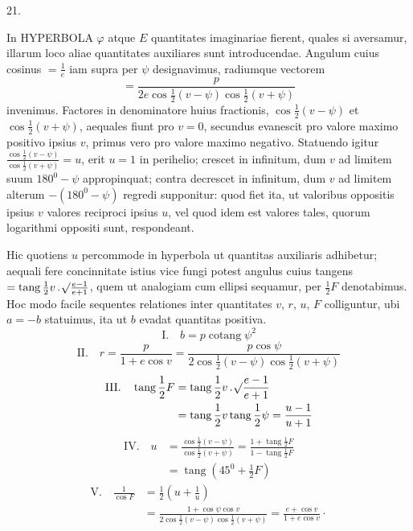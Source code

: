 \begin{center}
\hypertarget{native-038-article021}{}21.
\end{center}
In HYPERBOLA $\varphi$ atque $E$ quantitates imaginariae fierent, quales si aversamur, illarum loco aliae quantitates auxiliares sunt introducendae. Angulum cuius cosinus $=\frac{1}{e}$ iam supra per $\psi$ designavimus, radiumque vectorem
\[
=\frac{p}{2e\cos\frac{1}{2}(v-\psi)\cos\frac{1}{2}(v+\psi)}
\]
invenimus. Factores in denominatore huius fractionis, $\cos\frac{1}{2}(v-\psi)$ et $\cos\frac{1}{2}(v+\psi)$, aequales fiunt pro $v=0$, secundus evanescit pro valore maximo positivo ipsius $v$, primus vero pro valore maximo negativo. Statuendo igitur $\frac{\cos\frac{1}{2}(v-\psi)}{\cos\frac{1}{2}(v+\psi)}=u$, erit $u=1$ in perihelio; crescet in infinitum, dum $v$ ad limitem suum $180^0-\psi$ appropinquat; contra decrescet in infinitum, dum $v$ ad limitem alterum $-(180^0-\psi)$ regredi supponitur: quod fiet ita, ut valoribus oppositis ipsius $v$ valores reciproci ipsius $u$, vel quod idem est valores tales, quorum logarithmi oppositi sunt, respondeant.

Hic quotiens $u$ percommode in hyperbola ut quantitas auxiliaris adhibetur; aequali fere concinnitate istius vice fungi potest angulus cuius tangens $=\operatorname{tang}\frac{1}{2}v\, .\,\mathord{{}^{}\!\surd}\frac{e-1}{e+1}$, quem ut analogiam cum ellipsi sequamur, per $\frac{1}{2}F$ denotabimus. Hoc modo facile sequentes relationes inter quantitates $v$, $r$, $u$, $F$ colliguntur, ubi $a=-b$ statuimus, ita ut $b$ evadat quantitas positiva.
\[
\mathrm{I.}\quad b=p\operatorname{cotang}\psi^2
\]
\[
\mathrm{II.}\quad r=\frac{p}{1+e\cos v}=\frac{p\cos\psi}{2\cos\frac{1}{2}(v-\psi)\cos\frac{1}{2}(v+\psi)}
\]
\[
\begin{aligned}
\mathrm{III.}\quad\operatorname{tang}\frac{1}{2}F&=\operatorname{tang}\frac{1}{2}v\, .\,\mathord{{}^{}\!\surd}\frac{e-1}{e+1}\\
&=\operatorname{tang}\frac{1}{2}v\operatorname{tang}\frac{1}{2}\psi=\frac{u-1}{u+1}
\end{aligned}
\]
\[
\begin{aligned}
\mathrm{IV.}\quad u&=\frac{\cos\frac{1}{2}(v-\psi)}{\cos\frac{1}{2}(v+\psi)}=\frac{1+\operatorname{tang}\frac{1}{2}F}{1-\operatorname{tang}\frac{1}{2}F}\\
&=\operatorname{tang}(45^0+\frac{1}{2}F)
\end{aligned}
\]
\[
\begin{aligned}
\mathrm{V.}\quad\frac{1}{\cos F}&=\frac{1}{2}\left(u+\frac{1}{u}\right)\\
&=\frac{1+\cos\psi\cos v}{2\cos\frac{1}{2}(v-\psi)\cos\frac{1}{2}(v+\psi)}=\frac{e+\cos v}{1+e\cos v}\cdot
\end{aligned}
\]

